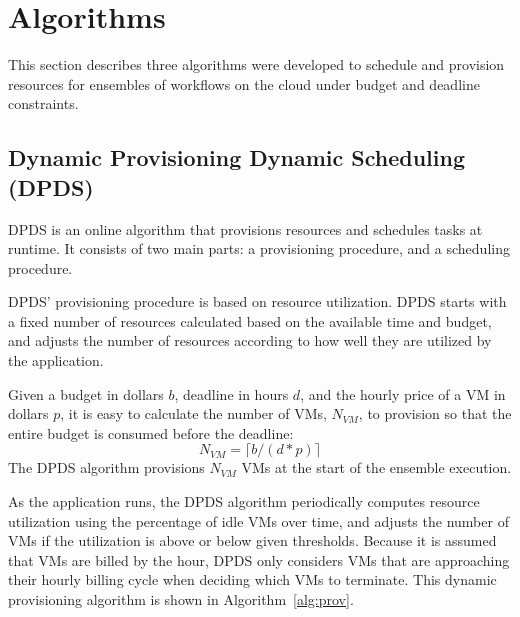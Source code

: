 \documentclass[conference]{IEEEtran}
\begin{document}
\section{Algorithms}
\label{sec:algorithms}

This section describes three algorithms were developed to schedule and provision resources for ensembles of workflows on the cloud under budget and deadline constraints.

\subsection{Dynamic Provisioning Dynamic Scheduling (DPDS)}
\label{sec:dpds}

DPDS is an online algorithm that provisions resources and schedules tasks at runtime. It consists of two main parts: a provisioning procedure, and a scheduling procedure.

DPDS' provisioning procedure is based on resource utilization. DPDS starts with a fixed number of resources calculated based on the available time and budget, and adjusts the number of resources according to how well they are utilized by the application.

Given a budget in dollars $b$, deadline in hours $d$, and the hourly price of a VM in dollars $p$, it is easy to calculate the number of VMs, $N_{VM}$, to provision so that the entire budget is consumed before the deadline:
%
\begin{equation}
\label{eq:static-plan}
N_{VM} = \lceil b / (d * p) \rceil
\end{equation}
%
The DPDS algorithm provisions $N_{VM}$ VMs at the start of the ensemble execution.

As the application runs, the DPDS algorithm periodically computes resource utilization using the percentage of idle VMs over time, and adjusts the number of VMs if the utilization is above or below given thresholds. Because it is assumed that VMs are billed by the hour, DPDS only considers VMs that are approaching their hourly billing cycle when deciding which VMs to terminate. This dynamic provisioning algorithm is shown in Algorithm~\ref{alg:prov}.
\end{document}
